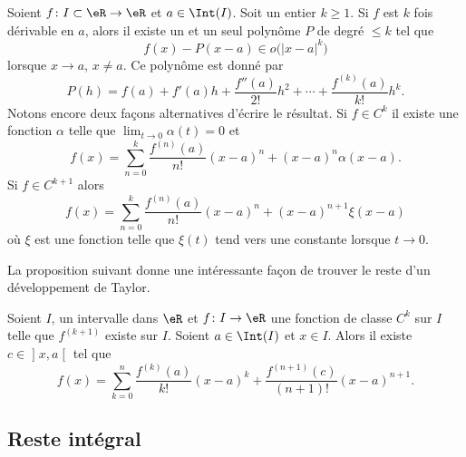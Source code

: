 \begin{proposition}     \label{PropDevTaylorPol}
	Soient \( f\colon I\subset\eR\to \eR\) et \( a\in\Int(I)\). Soit un entier \( k\geq 1\). Si \( f\) est \( k\) fois dérivable en \( a\), alors il existe un et un seul polynôme \( P\) de degré \( \leq k\) tel que
	\begin{equation}
		f(x)-P(x-a)\in o\big( | x-a |^k \big)
	\end{equation}
	lorsque \( x\to a\), \( x\neq a\). Ce polynôme  est donné par
	\begin{equation}
		P(h)=f(a)+f'(a)h+\frac{ f''(a) }{ 2! }h^2+\cdots+\frac{ f^{(k)}(a) }{ k! }h^k.
	\end{equation}
	Notons encore deux façons alternatives d'écrire le résultat. Si \( f\in C^k\) il existe une fonction \( \alpha\) telle que \( \lim_{t\to 0} \alpha(t)=0\) et
	\begin{equation}
		f(x)=\sum_{n=0}^k\frac{ f^{(n)}(a) }{ n! }(x-a)^n+(x-a)^n\alpha(x-a).
	\end{equation}
	Si \( f\in C^{k+1}\) alors
	\begin{equation}        \label{EquQtpoN}
		f(x)=\sum_{n=0}^k\frac{ f^{(n)}(a) }{ n! }(x-a)^n+(x-a)^{n+1}\xi(x-a)
	\end{equation}
	où \( \xi\) est une fonction telle que \( \xi(t)\) tend vers une constante lorsque \( t\to 0\).
\end{proposition}

La proposition suivant donne une intéressante façon de trouver le reste d'un développement de Taylor.
\begin{proposition}     \label{PropResteTaylorc}
	Soient \( I\), un intervalle dans \( \eR\) et \( f\colon I\to \eR\) une fonction de classe \( C^k\) sur \( I\) telle que \( f^{(k+1)}\) existe sur \( I\). Soient \( a\in\Int(I)\) et \( x\in I\). Alors il existe \( c\in\mathopen] x , a \mathclose[\) tel que
	\begin{equation}
		f(x)=\sum_{k=0}^n\frac{ f^{(k)}(a) }{ k! }(x-a)^k+\frac{ f^{(n+1)}(c) }{ (n+1)! }(x-a)^{n+1}.
	\end{equation}
\end{proposition}

\subsection{Reste intégral}

